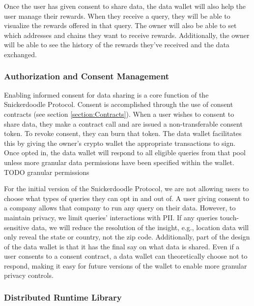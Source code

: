 Once the user has given consent to share data, the data wallet will also help the user manage their rewards. When they receive a query, they will be able to visualize the rewards offered in that query. The owner will also be able to set which addresses and chains they want to receive rewards. Additionally, the owner will be able to see the history of the rewards they've received and the data exchanged. 

\subsubsection{Authorization and Consent Management}
Enabling informed consent for data sharing is a core function of the Snickerdoodle Protocol. Consent is accomplished through the use of consent contracts (see section \ref{section:Contracts}). When a user wishes to consent to share data, they make a contract call and are issued a non-transferable consent token. To revoke consent, they can burn that token. The data wallet facilitates this by giving the owner's crypto wallet the appropriate transactions to sign. Once opted in, the data wallet will respond to all eligible queries from that pool unless more granular data permissions have been specified within the wallet. TODO granular permissions


For the initial version of the Snickerdoodle Protocol, we are not allowing users to choose what types of queries they can opt in and out of. A user giving consent to a company allows that company to run any query on their data. However, to maintain privacy, we limit queries' interactions with PII. If any queries touch-sensitive data, we will reduce the resolution of the insight, e.g., location data will only reveal the state or country, not the zip code. Additionally, part of the design of the data wallet is that it has the final say on what data is shared. Even if a user consents to a consent contract, a data wallet can theoretically choose not to respond, making it easy for future versions of the wallet to enable more granular privacy controls.

\subsubsection{Distributed Runtime Library}

